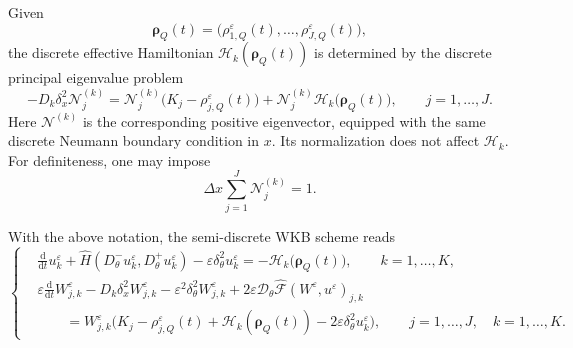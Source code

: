 \documentclass[11pt]{article}
\begin{document}
Given
\[
\boldsymbol\rho_Q(t)
=
\bigl(\rho_{1,Q}^\varepsilon(t),\dots,\rho_{J,Q}^\varepsilon(t)\bigr),
\]
the discrete effective Hamiltonian
\(\mathcal H_k(\boldsymbol\rho_Q(t))\) is determined by the discrete
principal eigenvalue problem
\begin{equation}\label{eq:eigen_discrete}
-D_k\delta_x^2\mathcal N_j^{(k)}
=
\mathcal N_j^{(k)}
\bigl(K_j-\rho_{j,Q}^\varepsilon(t)\bigr)
+
\mathcal N_j^{(k)}
\mathcal H_k\bigl(\boldsymbol\rho_Q(t)\bigr),
\qquad
j=1,\dots,J .
\end{equation}
Here \(\mathcal N^{(k)}\) is the corresponding positive eigenvector, equipped
with the same discrete Neumann boundary condition in \(x\). Its normalization
does not affect \(\mathcal H_k\). For definiteness, one may impose
\[
\Delta x\sum_{j=1}^J \mathcal N_j^{(k)}=1 .
\]

With the above notation, the semi-discrete WKB scheme reads
\begin{equation}\label{eq:semi_discrete_WKB_system}
\left\{
\begin{aligned}
&\frac{\mathrm d}{\mathrm dt}u_k^\varepsilon
+
\widehat H
\left(
D_\theta^-u_k^\varepsilon,
D_\theta^+u_k^\varepsilon
\right)
-
\varepsilon\delta_\theta^2u_k^\varepsilon
=
-\mathcal H_k\bigl(\boldsymbol\rho_Q(t)\bigr),
\qquad
k=1,\dots,K,
\\[1mm]
&\varepsilon
\frac{\mathrm d}{\mathrm dt}W_{j,k}^\varepsilon
-
D_k\delta_x^2W_{j,k}^\varepsilon
-
\varepsilon^2\delta_\theta^2W_{j,k}^\varepsilon
+
2\varepsilon
\mathcal D_\theta
\widehat{\mathcal F}(W^\varepsilon,u^\varepsilon)_{j,k}
\\
&\qquad =
W_{j,k}^\varepsilon
\bigl(
K_j-\rho_{j,Q}^\varepsilon(t)
+\mathcal H_k(\boldsymbol\rho_Q(t))
-2\varepsilon\delta_\theta^2u_k^\varepsilon
\bigr),
\qquad
j=1,\dots,J,\quad k=1,\dots,K .
\end{aligned}
\right.
\end{equation}
\end{document}
